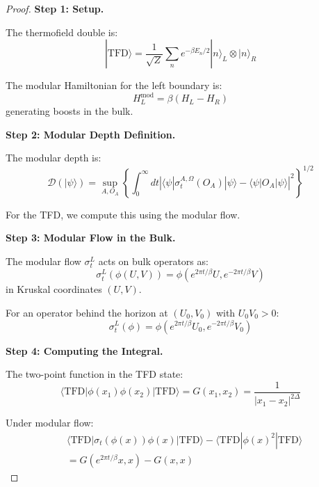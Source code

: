 \documentclass[12pt,a4paper]{article}
\begin{document}
\begin{proof}
\textbf{Step 1: Setup.}

The thermofield double is:
\begin{equation}
|\text{TFD}\rangle = \frac{1}{\sqrt{Z}} \sum_n e^{-\beta E_n/2} |n\rangle_L \otimes |n\rangle_R
\end{equation}

The modular Hamiltonian for the left boundary is:
\begin{equation}
H_L^{\text{mod}} = \beta(H_L - H_R)
\end{equation}
generating boosts in the bulk.

\textbf{Step 2: Modular Depth Definition.}

The modular depth is:
\begin{equation}
\mathcal{D}(|\psi\rangle) = \sup_{A, O_A} \left\{ \int_0^\infty dt \left| \langle \psi | \sigma_t^{A,\Omega}(O_A) | \psi \rangle - \langle \psi | O_A | \psi \rangle \right|^2 \right\}^{1/2}
\end{equation}

For the TFD, we compute this using the modular flow.

\textbf{Step 3: Modular Flow in the Bulk.}

The modular flow $\sigma_t^{L}$ acts on bulk operators as:
\begin{equation}
\sigma_t^{L}(\phi(U, V)) = \phi(e^{2\pi t/\beta}U, e^{-2\pi t/\beta}V)
\end{equation}
in Kruskal coordinates $(U, V)$.

For an operator behind the horizon at $(U_0, V_0)$ with $U_0 V_0 > 0$:
\begin{equation}
\sigma_t^{L}(\phi) = \phi(e^{2\pi t/\beta}U_0, e^{-2\pi t/\beta}V_0)
\end{equation}

\textbf{Step 4: Computing the Integral.}

The two-point function in the TFD state:
\begin{equation}
\langle \text{TFD} | \phi(x_1)\phi(x_2) | \text{TFD} \rangle = G(x_1, x_2) = \frac{1}{|x_1 - x_2|^{2\Delta}}
\end{equation}

Under modular flow:
\begin{align}
&\langle \text{TFD} | \sigma_t(\phi(x))\phi(x) | \text{TFD} \rangle - \langle \text{TFD} | \phi(x)^2 | \text{TFD} \rangle \\
&= G(e^{2\pi t/\beta}x, x) - G(x, x)
\end{align}


\end{proof}
\end{document}
